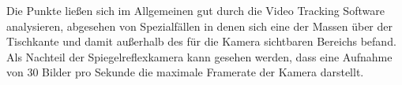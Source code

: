  Die Punkte ließen sich im Allgemeinen gut durch die Video Tracking Software analysieren, abgesehen von Spezialfällen in denen sich eine der Massen über der Tischkante und damit außerhalb des für die Kamera sichtbaren Bereichs befand.
Als Nachteil der Spiegelreflexkamera kann gesehen werden, dass eine Aufnahme von 30 Bilder pro Sekunde die maximale Framerate der Kamera darstellt.

